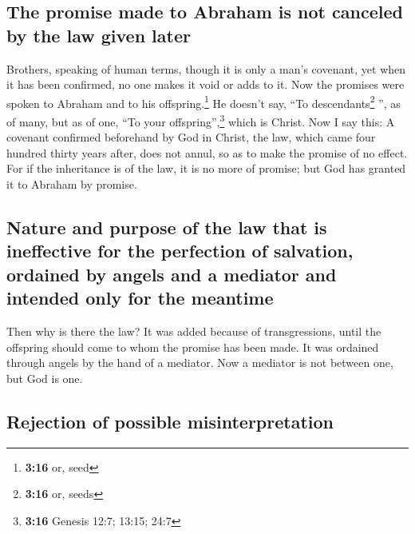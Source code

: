 \hypertarget{the-promise-made-to-abraham-is-not-canceled-by-the-law-given-later}{%
\subsection{The promise made to Abraham is not canceled by the law given
later}\label{the-promise-made-to-abraham-is-not-canceled-by-the-law-given-later}}

 Brothers, speaking of human terms, though it is only a
man's covenant, yet when it has been confirmed, no one makes it void or
adds to it.  Now the promises were spoken to Abraham and
to his offspring.\footnote{\textbf{3:16} or, seed} He doesn't say, ``To
descendants\footnote{\textbf{3:16} or, seeds} '', as of many, but as of
one, ``To your offspring'',\footnote{\textbf{3:16} Genesis 12:7; 13:15;
  24:7} which is Christ.  Now I say this: A covenant
confirmed beforehand by God in Christ, the law, which came four hundred
thirty years after, does not annul, so as to make the promise of no
effect.  For if the inheritance is of the law, it is no
more of promise; but God has granted it to Abraham by promise.

\hypertarget{nature-and-purpose-of-the-law-that-is-ineffective-for-the-perfection-of-salvation-ordained-by-angels-and-a-mediator-and-intended-only-for-the-meantime}{%
\subsection{Nature and purpose of the law that is ineffective for the
perfection of salvation, ordained by angels and a mediator and intended
only for the
meantime}\label{nature-and-purpose-of-the-law-that-is-ineffective-for-the-perfection-of-salvation-ordained-by-angels-and-a-mediator-and-intended-only-for-the-meantime}}

 Then why is there the law? It was added because of
transgressions, until the offspring should come to whom the promise has
been made. It was ordained through angels by the hand of a mediator.
 Now a mediator is not between one, but God is one.

\hypertarget{rejection-of-possible-misinterpretation}{%
\subsection{Rejection of possible
misinterpretation}\label{rejection-of-possible-misinterpretation}}

